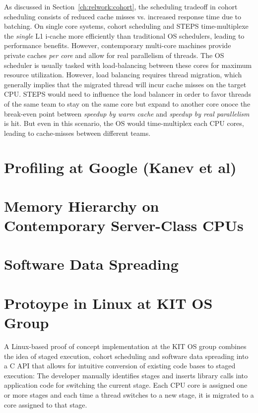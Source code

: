 \documentclass[12pt,a4paper]{book}
\begin{document}
As discussed in Section~\ref{ch:relwork:cohort}, the scheduling tradeoff in cohort scheduling consists of reduced cache misses vs. increased response time due to batching.
On single core systems, cohort scheduling and STEPS time-multiplexe the \emph{single} L1 i-cache more efficiently than traditional OS schedulers, leading to performance benefits.
However, contemporary multi-core machines provide private caches \emph{per core} and allow for real parallelism of threads.
The OS scheduler is usually tasked with load-balancing between these cores for maximum resource utilization.
However, load balancing requires thread migration, which generally implies that the migrated thread will incur cache misses on the target CPU.
STEPS would need to influence the load balancer in order to favor threads of the same team to stay on the same core but expand to another core onoce the break-even point between \textit{speedup by warm cache} and \textit{speedup by real parallelism} is hit.
But even in this scenario, the OS would time-multiplex each CPU cores, leading to cache-misses between different teams.


\section{Profiling at Google (Kanev et al)}
\blindtext

\section{Memory Hierarchy on Contemporary Server-Class CPUs}
\blindtext

\section{Software Data Spreading}
\blindtext

\section{Protoype in Linux at KIT OS Group}\label{ch:relwork:kitpoc}
A Linux-based proof of concept implementation at the KIT OS group combines the idea of staged execution, cohort
scheduling and software data spreading into a C API that allows for intuitive conversion of existing code bases to
staged execution:
The developer manually identifies stages and inserts library calls into application code for switching the current stage.
Each CPU core is assigned one or more stages and each time a thread switches to a new stage, it is migrated to a core
assigned to that stage.
\end{document}
